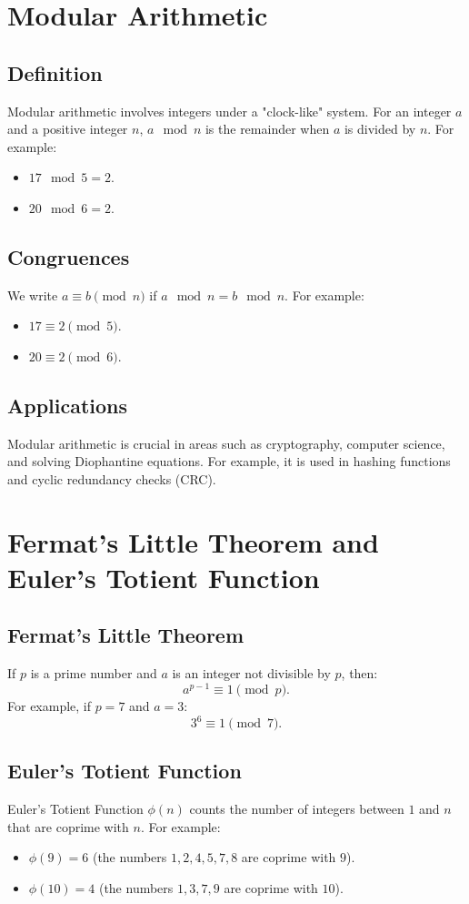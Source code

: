 \documentclass[12pt]{article}
\begin{document}
\section{Modular Arithmetic}

\subsection{Definition}
Modular arithmetic involves integers under a "clock-like" system. For an integer $a$ and a positive integer $n$, $a \mod n$ is the remainder when $a$ is divided by $n$. For example:
\begin{itemize}
    \item $17 \mod 5 = 2$.
    \item $20 \mod 6 = 2$.
\end{itemize}

\subsection{Congruences}
We write $a \equiv b \pmod{n}$ if $a \mod n = b \mod n$. For example:
\begin{itemize}
    \item $17 \equiv 2 \pmod{5}$.
    \item $20 \equiv 2 \pmod{6}$.
\end{itemize}

\subsection{Applications}
Modular arithmetic is crucial in areas such as cryptography, computer science, and solving Diophantine equations. For example, it is used in hashing functions and cyclic redundancy checks (CRC).

\section{Fermat's Little Theorem and Euler's Totient Function}

\subsection{Fermat's Little Theorem}
If $p$ is a prime number and $a$ is an integer not divisible by $p$, then:
\[
a^{p-1} \equiv 1 \pmod{p}.
\]
For example, if $p = 7$ and $a = 3$:
\[
3^6 \equiv 1 \pmod{7}.
\]

\subsection{Euler's Totient Function}
Euler's Totient Function $\phi(n)$ counts the number of integers between $1$ and $n$ that are coprime with $n$. For example:
\begin{itemize}
    \item $\phi(9) = 6$ (the numbers $1, 2, 4, 5, 7, 8$ are coprime with $9$).
    \item $\phi(10) = 4$ (the numbers $1, 3, 7, 9$ are coprime with $10$).
\end{itemize}
\end{document}
